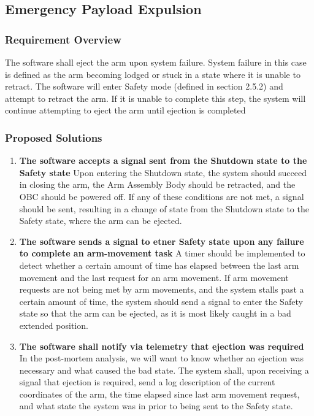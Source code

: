 \documentclass[letterpaper,10pt]{article}
\begin{document}
\subsection{Emergency Payload Expulsion}
\subsubsection{Requirement Overview}
The software shall eject the arm upon system failure. 
System failure in this case is defined as the arm becoming lodged or stuck in a state where it is unable to retract.
The software will enter Safety mode (defined in section 2.5.2) and attempt to retract the arm. If it is unable to complete this step,
 the system will continue attempting to eject the arm until ejection is completed
\subsubsection{Proposed Solutions}
\begin{enumerate}
\item{
\textbf{The software accepts a signal sent from the Shutdown state to the Safety state}
Upon entering the Shutdown state, the system should succeed in closing the arm, the Arm Assembly Body should be retracted, 
and the OBC should be powered off. If any of these conditions are not met, a signal should be sent, resulting in a change of state
from the Shutdown state to the Safety state, where the arm can be ejected.
}
\item{
	\textbf{The software sends a signal to etner Safety state upon any failure to complete an arm-movement task}
A timer should be implemented to detect whether a certain amount of time has elapsed between the last arm movement and the last 
request for an arm movement. If arm movement requests are not being met by arm movements, and the system stalls past a certain amount 
of time, the system should send a signal to enter the Safety state so that the arm can be ejected, as it is most likely caught
in a bad extended position.
}
\item{
	\textbf{The software shall notify via telemetry that ejection was required}
In the post-mortem analysis, we will want to know whether an ejection was necessary and what caused the bad state. The system
shall, upon receiving a signal that ejection is required, send a log description of the current coordinates of the arm, the time 
elapsed since last arm movement request, and what state the system was in prior to being sent to the Safety state.
}
\end{enumerate}
\end{document}
